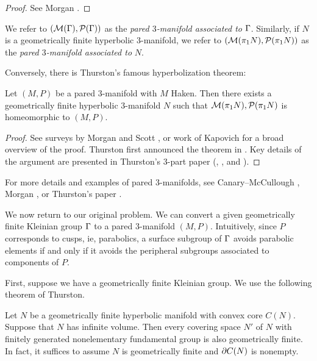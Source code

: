 \begin{proof}

See Morgan \cite[Corollary 6.10]{Mo}. %

\end{proof}

We refer to $(\mathcal{M}(\Gamma),\mathcal{P}(\Gamma))$ as the \emph{pared $3$-manifold associated
to} $\Gamma$.  Similarly, if $N$ is a geometrically finite hyperbolic
$3$-manifold, we refer to $(\mathcal{M}(\pi_1N),\mathcal{P}(\pi_1N))$ as the \emph{pared
$3$-manifold associated to} $N$.

Conversely, there is Thurston's famous hyperbolization theorem:

\begin{thm}

Let $(M,P)$ be a pared $3$-manifold with $M$ Haken. Then there exists
a geometrically finite hyperbolic $3$-manifold $N$ such that
$\mathcal{M}(\pi_1N),\mathcal{P}(\pi_1N)$ is homeomorphic to $(M,P)$.

\end{thm}

\begin{proof}

See surveys by Morgan \cite{Mo} and Scott \cite{ThurstonviaScott}, or work of
Kapovich \cite{Kapovich} for a broad overview of the proof. Thurston first
announced the theorem in \cite{Thurston0}. Key details of the argument are
presented in Thurston's 3-part paper (\cite{ThurstonI}, \cite{ThurstonII}, and
\cite{ThurstonIII}).

\end{proof}

For more details and examples of pared $3$-manifolds, see Canary--McCullough
\cite{CMc}, Morgan \cite{Mo}, or Thurston's paper \cite{ThurstonI}.

We now return to our original problem. We can convert a given geometrically
finite Kleinian group $\Gamma$ to a pared $3$-manifold $(M,P)$. Intuitively, since
$P$ corresponds to cusps, ie, parabolics, a surface subgroup of $\Gamma$ avoids
parabolic elements if and only if it avoids the peripheral subgroups associated
to components of $P$.

First, suppose we have a geometrically finite Kleinian group.  We use the
following theorem of Thurston.

\begin{thm}

Let $N$ be a geometrically finite hyperbolic manifold with convex core $C(N)$.
Suppose that $N$ has infinite volume. Then every covering space $N'$ of $N$
with finitely generated nonelementary fundamental group is also geometrically
finite. In fact, it suffices to assume $N$ is geometrically finite and $\partial
C(N)$ is nonempty.


\end{thm}

